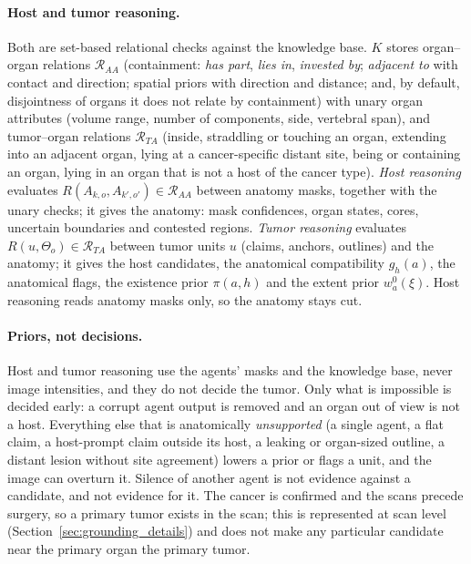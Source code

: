 \documentclass[fleqn,10pt]{olplainarticle}
\begin{document}
\paragraph{Host and tumor reasoning.}
Both are set-based relational checks against the knowledge base. $K$ stores organ--organ relations $\mathcal{R}_{AA}$
(containment: \emph{has part}, \emph{lies in}, \emph{invested by}; \emph{adjacent to} with contact and direction; spatial
priors with direction and distance; and, by default, disjointness of organs it does not relate by containment) with unary
organ attributes (volume range, number of components, side, vertebral span), and tumor--organ relations $\mathcal{R}_{TA}$
(inside, straddling or touching an organ, extending into an adjacent organ, lying at a cancer-specific distant site, being
or containing an organ, lying in an organ that is not a host of the cancer type). \emph{Host reasoning} evaluates
$R(A_{k,o},A_{k',o'})\in\mathcal{R}_{AA}$ between anatomy masks, together with the unary checks; it gives the anatomy:
mask confidences, organ states, cores, uncertain boundaries and contested regions. \emph{Tumor reasoning} evaluates
$R(u,\Theta_o)\in\mathcal{R}_{TA}$ between tumor units $u$ (claims, anchors, outlines) and the anatomy; it gives the host
candidates, the anatomical compatibility $g_h(a)$, the anatomical flags, the existence prior $\pi(a,h)$ and the extent
prior $w^0_a(\xi)$. Host reasoning reads anatomy masks only, so the anatomy stays cut.

\paragraph{Priors, not decisions.}
Host and tumor reasoning use the agents' masks and the knowledge base, never image intensities, and they do not decide the
tumor. Only what is impossible is decided early: a corrupt agent output is removed and an organ out of view is not a host.
Everything else that is anatomically \emph{unsupported} (a single agent, a flat claim, a host-prompt claim outside its
host, a leaking or organ-sized outline, a distant lesion without site agreement) lowers a prior or flags a unit, and the
image can overturn it. Silence of another agent is not evidence against a candidate, and not evidence for it. The cancer is
confirmed and the scans precede surgery, so a primary tumor exists in the scan; this is represented at scan level
(Section~\ref{sec:grounding_details}) and does not make any particular candidate near the primary organ the primary
tumor.
\end{document}

